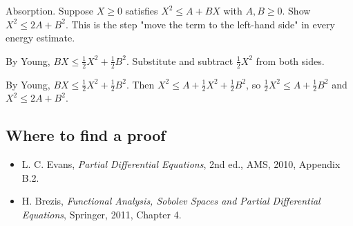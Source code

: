 \begin{exercise}
  Absorption. Suppose $X \ge 0$ satisfies $X^2 \le A + BX$ with $A, B \ge 0$. Show $X^2 \le 2A + B^2$. This is the step "move the term to the left-hand side" in every energy estimate.
  \begin{hint}
    By Young, $BX \le \frac12 X^2 + \frac12 B^2$. Substitute and subtract $\frac12 X^2$ from both sides.
  \end{hint}
  \begin{solution}
    By Young, $BX \le \frac12X^2 + \frac12B^2$. Then $X^2 \le A + \frac12X^2 + \frac12B^2$, so $\frac12X^2 \le A + \frac12B^2$ and $X^2 \le 2A + B^2$.
  \end{solution}
\end{exercise}

\subsection*{Where to find a proof}

\begin{itemize}
\item L. C. Evans, \emph{Partial Differential Equations}, 2nd ed., AMS, 2010, Appendix B.2.
\item H. Brezis, \emph{Functional Analysis, Sobolev Spaces and Partial Differential Equations}, Springer, 2011, Chapter 4.
\end{itemize}

\neededfor
